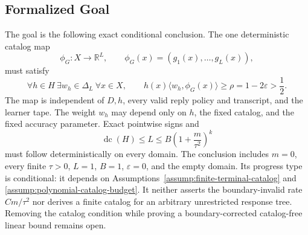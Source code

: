 \subsection{Formalized Goal}

The goal is the following exact conditional conclusion.  The one deterministic
catalog map
\[
\phi_G:X\to\mathbb R^L,\qquad
\phi_G(x)=(g_1(x),\ldots,g_L(x)),
\]
must satisfy
\[
\forall h\in H\ \exists w_h\in\Delta_L\ \forall x\in X,\qquad
h(x)\langle w_h,\phi_G(x)\rangle
\ge\rho=1-2\varepsilon>\frac12.
\]
The map is independent of $D,h$, every valid reply policy and transcript, and
the learner tape.  The weight $w_h$ may depend only on $h$, the fixed catalog,
and the fixed accuracy parameter.  Exact pointwise signs and
\[
\operatorname{dc}(H)\le L
\le B\left(1+\frac{m}{\tau^2}\right)^k
\]
must follow deterministically on every domain.  The conclusion includes
$m=0$, every finite $\tau>0$, $L=1$, $B=1$, $\varepsilon=0$, and the empty
domain.  Its progress type is conditional: it depends on
Assumptions~\ref{assump:finite-terminal-catalog} and
\ref{assump:polynomial-catalog-budget}.  It neither asserts the
boundary-invalid rate $Cm/\tau^2$ nor derives a finite catalog for an arbitrary
unrestricted response tree.  Removing the catalog condition while proving a
boundary-corrected catalog-free linear bound remains open.
